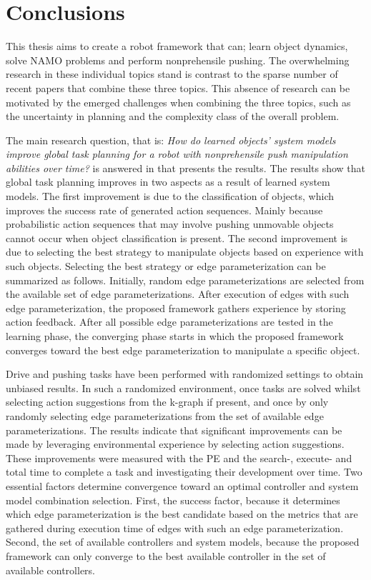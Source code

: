 \chapter{Conclusions}%
\label{chap:conclusion}
This thesis aims to create a robot framework that can; learn object dynamics, solve \ac{NAMO} problems and perform nonprehensile pushing. The overwhelming research in these individual topics stand is contrast to the sparse number of recent papers that combine these three topics. This absence of research can be motivated by the emerged challenges when combining the three topics, such as the uncertainty in planning and the complexity class of the overall problem.\bs

The main research question, that is: \textit{How do learned objects' system models improve global task planning for a robot with nonprehensile push manipulation abilities over time?} is answered in  that presents the results. The results show that global task planning improves in two aspects as a result of learned system models. The first improvement is due to the classification of objects, which improves the success rate of generated action sequences. Mainly because probabilistic action sequences that may involve pushing unmovable objects cannot occur when object classification is present. The second improvement is due to selecting the best strategy to manipulate objects based on experience with such objects. Selecting the best strategy or edge parameterization can be summarized as follows. Initially, random edge parameterizations are selected from the available set of edge parameterizations. After execution of edges with such edge parameterization, the proposed framework gathers experience by storing action feedback. After all possible edge parameterizations are tested in the learning phase, the converging phase starts in which the proposed framework converges toward the best edge parameterization to manipulate a specific object.\bs

Drive and pushing tasks have been performed with randomized settings to obtain unbiased results. In such a randomized environment, once tasks are solved whilst selecting action suggestions from the \ac{k-graph} if present, and once by only randomly selecting edge parameterizations from the set of available edge parameterizations. The results indicate that significant improvements can be made by leveraging environmental experience by selecting action suggestions. These improvements were measured with the \acl{PE} and the search-, execute- and total time to complete a task and investigating their development over time. Two essential factors determine convergence toward an optimal controller and system model combination selection. First, the success factor, because it determines which edge parameterization is the best candidate based on the metrics that are gathered during execution time of edges with such an edge parameterization. Second, the set of available controllers and system models, because the proposed framework can only converge to the best available controller in the set of available controllers.\bs

